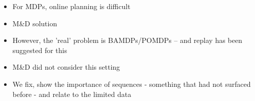 \begin{itemize}
    \item For MDPs, online planning is difficult
    \item M\&D solution
    \item However, the 'real' problem is BAMDPs/POMDPs -- and replay has been suggested for this
    \item M\&D did not consider this setting
    \item We fix, show the importance of sequences - something that had not surfaced before - and relate to the limited data
\end{itemize}
